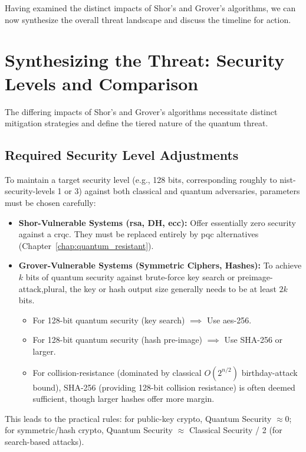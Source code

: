 Having examined the distinct impacts of Shor's and Grover's algorithms, we can now synthesize the overall threat landscape and discuss the timeline for action.
\newpage

\section{Synthesizing the Threat: Security Levels and Comparison}\label{sec:synthesis_ch5_rev}\label{sec:security_levels_ch5_rev} %

The differing impacts of Shor's and Grover's algorithms necessitate distinct mitigation strategies and define the tiered nature of the quantum threat.

\subsection{Required Security Level Adjustments}\label{subsec:security_levels_ch5_rev}
To maintain a target security level (e.g., 128 bits, corresponding roughly to \gls{nist-security-levels} 1 or 3) against both classical and quantum adversaries, parameters must be chosen carefully:
\begin{itemize}
    \item \textbf{Shor-Vulnerable Systems (\gls{rsa}, DH, \gls{ecc}):} Offer essentially zero security against a \gls{crqc}. They must be replaced entirely by \gls{pqc} alternatives (Chapter~\ref{chap:quantum_resistant}).
    \item \textbf{Grover-Vulnerable Systems (Symmetric Ciphers, Hashes):} To achieve $k$ bits of quantum security against brute-force key search or \gls{preimage-attack,plural}, the key or hash output size generally needs to be at least $2k$ bits.
        \begin{itemize}
            \item For 128-bit quantum security (key search) $\implies$ Use \gls{aes}-256.
            \item For 128-bit quantum security (hash pre-image) $\implies$ Use SHA-256 or larger.
            \item For \gls{collision-resistance} (dominated by classical $O(2^{n/2})$ \gls{birthday-attack} bound), SHA-256 (providing 128-bit collision resistance) is often deemed sufficient, though larger hashes offer more margin.
        \end{itemize}
\end{itemize}
This leads to the practical rules: for public-key crypto, Quantum Security $\approx 0$; for symmetric/hash crypto, Quantum Security $\approx$ Classical Security / 2 (for search-based attacks).
\newpage

